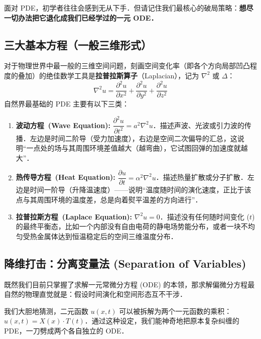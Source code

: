 \documentclass[12pt, a4paper, oneside, UTF8]{ctexbook}
\begin{document}
面对 PDE，初学者往往会感到无从下手．但请记住我们最核心的破局策略：\textbf{想尽一切办法把它退化成我们已经学过的一元 ODE．}

\subsection{三大基本方程（一般三维形式）}
对于物理世界中最一般的三维空间问题，刻画空间变化率（即各个方向局部凹凸程度的叠加）的绝佳数学工具是\textbf{拉普拉斯算子}（Laplacian），记为 $\nabla^2$ 或 $\Delta$：
\[ \nabla^2 u = \frac{\partial^2 u}{\partial x^2} + \frac{\partial^2 u}{\partial y^2} + \frac{\partial^2 u}{\partial z^2} \]
自然界最基础的 PDE 主要有以下三类：
\begin{enumerate}
    \item \textbf{波动方程~(Wave Equation):} $\dfrac{\partial^2 u}{\partial t^2} = a^2 \nabla^2 u$．描述声波、光波或引力波的传播．左边是时间二阶导（受力加速度），右边是空间二次偏导的汇总，这说明“一点处的场与其周围环境差值越大（越弯曲），它试图回弹的加速度就越大”．
    \item \textbf{热传导方程~(Heat Equation):} $\dfrac{\partial u}{\partial t} = \alpha^2 \nabla^2 u$．描述热量扩散或分子扩散．左边是时间一阶导（升降温速度）——说明“温度随时间的演化速度，正比于该点与其周围环境的温度差，总是向着熨平温差的方向进行”．
    \item \textbf{拉普拉斯方程~(Laplace Equation):} $\nabla^2 u = 0$．描述没有任何随时间变化 ($t$) 的最终平衡态，比如一个内部没有自由电荷的静电场势能分布，或者一块不均匀受热金属体达到恒温稳定后的空间三维温度分布．
\end{enumerate}

\subsection{降维打击：分离变量法 (Separation of Variables)}
既然我们目前只掌握了求解一元常微分方程 (ODE) 的本领，那求解偏微分方程最自然的物理直觉就是：假设时间演化和空间形态互不干涉．

我们大胆地猜测，二元函数 $u(x,t)$ 可以被拆解为两个一元函数的乘积：$u(x,t) = X(x) \cdot T(t)$．通过这种设定，我们能神奇地把原本复杂纠缠的 PDE，一刀劈成两个各自独立的 ODE．
\end{document}
